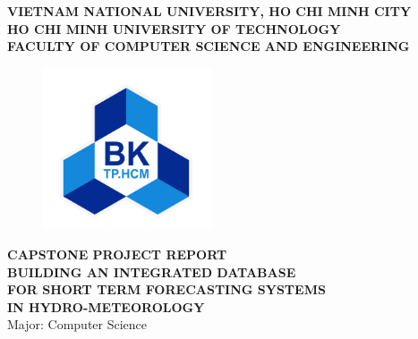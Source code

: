 \documentclass[12pt, a4paper]{report}
\begin{document}
\begin{titlepage}

    \begin{center}
        \large \textbf{VIETNAM NATIONAL UNIVERSITY, HO CHI MINH CITY} \\
        \large \textbf{HO CHI MINH UNIVERSITY OF TECHNOLOGY} \\
        \large \textbf{FACULTY OF COMPUTER SCIENCE AND ENGINEERING}
    \end{center}

    \begin{figure}[h!]
        \begin{center}
            \includegraphics[width=5cm]{Images/hcmut.png}
        \end{center}
    \end{figure}

    \begin{center}
        {\textbf{\Large CAPSTONE PROJECT REPORT}}\\
        \vspace{1cm}
        \textbf{\LARGE BUILDING AN INTEGRATED DATABASE}\\
        \textbf{\LARGE FOR SHORT TERM FORECASTING SYSTEMS}\\
        \textbf{\LARGE IN HYDRO-METEOROLOGY}\\
        \vspace{0.3cm}
        {\Large Major: Computer Science}\\
    \end{center}


\end{titlepage}
\end{document}

